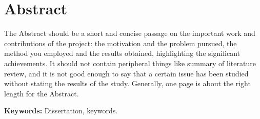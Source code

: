 \newpage
{}
\chapter*{\centering Abstract}
\begin{spacing}{1.5}
\setlength{\parskip}{0.3in}
\thispagestyle{addin}



The Abstract should be a short and concise passage on the important work and contributions of the project: the motivation and the problem pursued, the method you employed and the results obtained, highlighting the significant achievements. It should not contain peripheral things like summary of literature review, and it is not good enough to say that a certain issue has been studied without stating the results of the study. Generally, one page is about the right length for the Abstract.

\par
\thispagestyle{addin} %
\textbf{Keywords:} Dissertation, keywords.
\end{spacing}
\newpage
